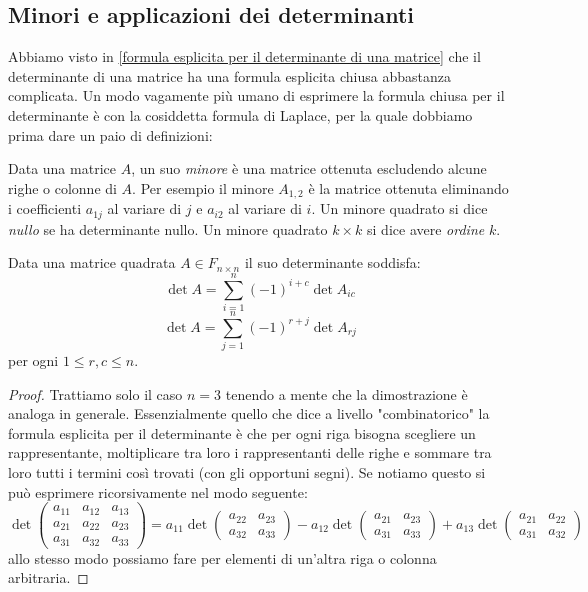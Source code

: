 \documentclass[11pt]{scrartcl}
\begin{document}
   	 \subsection{Minori e applicazioni dei determinanti}
   	 Abbiamo visto in \ref{formula esplicita per il determinante di una matrice} che il determinante di una matrice ha una formula esplicita chiusa abbastanza complicata. Un modo vagamente più umano di esprimere la formula chiusa per il determinante è con la cosiddetta formula di Laplace, per la quale dobbiamo prima dare un paio di definizioni:
   	 \begin{definition}[Minore]
   	 	Data una matrice $A$, un suo \textit{minore} è una matrice ottenuta escludendo alcune righe o colonne di $A$. Per esempio il minore $A_{1,2}$ è la matrice ottenuta eliminando i coefficienti $a_{1j}$ al variare di $j$ e $a_{i2}$ al variare di $i$. Un minore quadrato si dice \textit{nullo} se ha determinante nullo. Un minore quadrato $k\times k$ si dice avere \textit{ordine} $k$.
   	 \end{definition}
   	 \begin{lemma}
   	 	Data una matrice quadrata $A\in F_{n\times n}$ il suo determinante soddisfa:
   	 	$$\det A = \sum_{i=1}^{n}\left(-1\right)^{i+c}\det A_{ic}$$
   	 	$$\det A = \sum_{j=1}^{n}\left(-1\right)^{r+j}\det A_{rj}$$
   	 	per ogni $1\le r,c\le n$.
   	 \end{lemma}
   	 \begin{proof}
   	 	Trattiamo solo il caso $n=3$ tenendo a mente che la dimostrazione è analoga in generale. Essenzialmente quello che dice a livello "combinatorico" la formula esplicita per il determinante è che per ogni riga bisogna scegliere un rappresentante, moltiplicare tra loro i rappresentanti delle righe e sommare tra loro tutti i termini così trovati (con gli opportuni segni). Se notiamo questo si può esprimere ricorsivamente nel modo seguente:
   	 	$$
   	 	\det
   	 	\begin{pmatrix}
   	 		a_{11} & a_{12} & a_{13} \\
   	 		a_{21} & a_{22} & a_{23} \\
   	 		a_{31} & a_{32} & a_{33}
   	 	\end{pmatrix}
   	 	=
   	 	a_{11}\det\begin{pmatrix}
   	 		a_{22} & a_{23} \\
   	 		a_{32} & a_{33}
   	 	\end{pmatrix}
   	 	-a_{12}\det\begin{pmatrix}
   	 		a_{21} & a_{23} \\
   	 		a_{31} & a_{33}
   	 	\end{pmatrix}
   	 	+a_{13}\det\begin{pmatrix}
   	 		a_{21} & a_{22} \\
   	 		a_{31} & a_{32}
   	 	\end{pmatrix}
   	 	$$
   	 	allo stesso modo possiamo fare per elementi di un'altra riga o colonna arbitraria.
   	 \end{proof}
\end{document}
